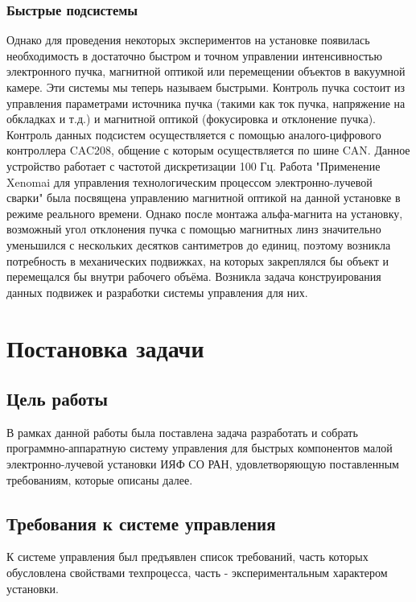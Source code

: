 \documentclass[14pt,russian,a4paper]{extarticle}
\begin{document}
\subsubsection{Быстрые подсистемы}
Однако для проведения некоторых экспериментов на установке появилась необходимость в достаточно быстром и точном управлении интенсивностью электронного пучка, магнитной оптикой или перемещении объектов в вакуумной камере. Эти системы мы теперь называем быстрыми.
\newline
Контроль пучка состоит из управления параметрами источника пучка (такими как ток пучка, напряжение на обкладках и т.д.) и магнитной оптикой (фокусировка и отклонение пучка). Контроль данных подсистем осуществляется с помощью аналого-цифрового контроллера CAC208, общение с которым осуществляется по шине CAN. Данное устройство работает с частотой дискретизации 100 Гц.
\newline
Работа "Применение Xenomai для управления технологическим процессом электронно-лучевой сварки" \cite{xeno_weld} была посвящена управлению магнитной оптикой на данной установке в режиме реального времени. Однако после монтажа альфа-магнита на установку, возможный угол отклонения пучка с помощью магнитных линз значительно уменьшился с нескольких десятков сантиметров до единиц, поэтому возникла потребность в механических подвижках, на которых закреплялся бы объект и перемещался бы внутри рабочего объёма. Возникла задача конструирования данных подвижек и разработки системы управления для них.

\newpage

\section{Постановка задачи}
\subsection{Цель работы}
В рамках данной работы была поставлена задача разработать и собрать программно-аппаратную систему управления для быстрых компонентов малой электронно-лучевой установки ИЯФ СО РАН, удовлетворяющую поставленным требованиям, которые описаны далее.

\subsection{Требования к системе управления}
К системе управления был предъявлен список требований, часть которых обусловлена свойствами техпроцесса, часть - экспериментальным характером установки.
\end{document}
